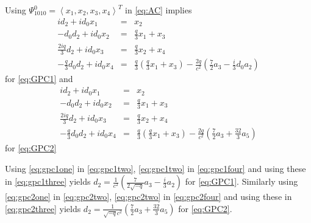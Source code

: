 Using $\Psi_{1010}^0 = \left<x_1,x_2,x_3,x_4\right>^T$ in \eqref{eq:AC} implies 
\begin{subequations}
\begin{eqnarray}
i d_2 + i d_0 x_1 &=& x_2 \label{eq:gpc1one} \\
- d_0 d_2 + i d_0 x_2 &=& \frac{q}{3} x_1 + x_3 \label{eq:gpc1two} \\
\frac{2 i q}{3} d_2 + i d_0 x_3 &=& \frac{q}{3} x_2 + x_4  \label{eq:gpc1three} \\
- \frac{q}{3} d_0 d_2 + i d_0 x_4 &=& \frac{q}{3}\left(\frac{q}{3} x_1 + x_3 \right) - \frac{ 2 q}{c^2}\left(\frac{7}{2} a_3 - \frac{i}{3} d_0 a_2\right) \label{eq:gpc1four}
\end{eqnarray}
\end{subequations}
for \eqref{eq:GPC1} and
\begin{subequations}
\begin{eqnarray}
i d_2 + i d_0 x_1 &=& x_2 \label{eq:gpc2one} \\
- d_0 d_2 + i d_0 x_2 &=& \frac{q}{3} x_1 + x_3 \label{eq:gpc2two} \\
\frac{2 i q}{3} d_2 + i d_0 x_3 &=& \frac{q}{3} x_2 + x_4  \label{eq:gpc2three} \\
- \frac{q}{3} d_0 d_2 + i d_0 x_4 &=& \frac{q}{3}\left(\frac{q}{3} x_1 + x_3 \right) - \frac{2 q}{c^2}\left( \frac{7}{2} a_3 + \frac{32}{3} a_5\right) \label{eq:gpc2four}
\end{eqnarray}
\end{subequations}
for \eqref{eq:GPC2}

Using \eqref{eq:gpc1one} in \eqref{eq:gpc1two}, \eqref{eq:gpc1two} in \eqref{eq:gpc1four} and using these in \eqref{eq:gpc1three} yields 
$ d_2 = \frac{1}{c^2}\left( \frac{7}{2 \sqrt{-q} } a_3 - \frac{i}{3} a_2 \right)$ for \eqref{eq:GPC1}.
Similarly using \eqref{eq:gpc2one} in \eqref{eq:gpc2two}, \eqref{eq:gpc2two} in \eqref{eq:gpc2four} and using these in \eqref{eq:gpc2three}  yields
$ d_2 = \frac{1}{\sqrt{-q} c^2}\left( \frac{7}{2 } a_3 + \frac{32}{3} a_5 \right)$  for \eqref{eq:GPC2}. 

